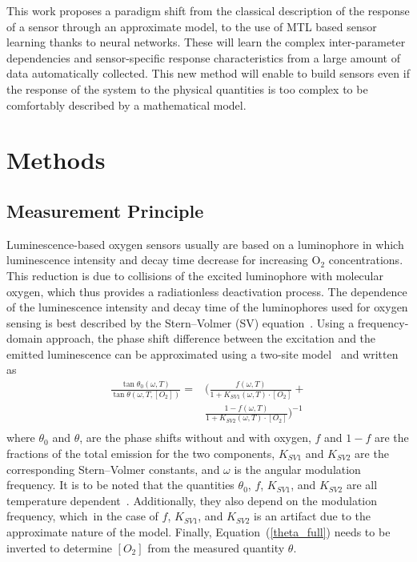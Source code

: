 \documentclass[sensors,article,accept,moreauthors,pdftex,10pt,a4paper]{Definitions/mdpi}
\theoremstyle{definition}
\begin{document}
This work proposes a paradigm shift from the classical description of the response of a sensor through an approximate model, to the use of MTL based sensor learning thanks to neural networks. 
These will learn the complex inter-parameter dependencies and sensor-specific response characteristics from a large amount of data automatically collected. This new method will enable to build sensors even if the response of the system to the physical quantities is too complex to be comfortably described by a mathematical model.


\section{Methods}
\label{sec:methods}
\vspace{-6pt}

\subsection{Measurement Principle}
\label{Theory}

Luminescence-based oxygen sensors usually are based on a luminophore in which luminescence intensity and decay time decrease for increasing O$_2$ concentrations. This reduction is due to collisions of the excited luminophore with molecular oxygen, which thus provides a radiationless deactivation process. The dependence of the luminescence intensity and decay time of the luminophores used for oxygen sensing is best described by the Stern--Volmer (SV) equation~\cite{Lakowicz2006}. Using a frequency-domain approach, the phase shift difference between the excitation and the emitted luminescence can be approximated using a two-site model~\cite{Carraway1991,Demas1995} and written as~\cite{Michelucci2019} %
\begin{equation}
\begin{aligned}
\frac{\tan \theta_0 (\omega, T)}{\tan \theta (\omega, T, [O_2])}=
 & \bigg( \frac{f (\omega , T) }{1+K_{SV1} (\omega , T) \cdot \left[O_2\right]}+ \\
&\frac{1-f (\omega , T) }{1+K_{SV2} (\omega , T) \cdot \left[O_2\right]} \bigg)^{-1} \\
\label{theta_full}
\end{aligned}
\end{equation}
where $\theta_0$ and $\theta$, are the phase shifts without and with oxygen, $f$ and $1-f$ are the fractions of the total emission for the two components, $K_{SV1}$ and $K_{SV2}$ are the corresponding Stern–Volmer constants, and $\omega$ is the angular modulation frequency. It is to be noted that the quantities $\theta_0$, $f$, $K_{SV1}$, and $K_{SV2}$ are all temperature dependent~\cite{Ogurtsov2006,lo2008,Zaitsev2016}. Additionally, they also depend on the modulation frequency, which~in the case of $f$, $K_{SV1}$, and $K_{SV2}$ is an artifact due to the approximate nature of the model. Finally, Equation~(\ref{theta_full}) needs to be inverted to determine $[O_2]$ from the measured quantity $\theta$.
\end{document}
